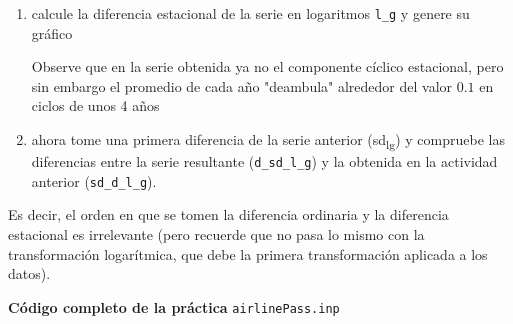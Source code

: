 \documentclass[11pt]{article}
\begin{document}
\begin{enumerate}
\item calcule la diferencia estacional de la serie en logaritmos \texttt{l\_g} y
genere su gráfico

Observe que en la serie obtenida ya no el componente cíclico
estacional, pero sin embargo el promedio de cada año "deambula"
alrededor del valor \(0.1\) en ciclos de unos 4 años

\item ahora tome una primera diferencia de la serie anterior (sd\textsubscript{l}\textsubscript{g}) y
compruebe las diferencias entre la serie resultante (\texttt{d\_sd\_l\_g}) y
la obtenida en la actividad anterior (\texttt{sd\_d\_l\_g}).
\end{enumerate}

Es decir, el orden en que se tomen la diferencia ordinaria y la
diferencia estacional es irrelevante (pero recuerde que no pasa lo
mismo con la transformación logarítmica, que debe la primera
transformación aplicada a los datos).

\vspace{10pt}
\noindent
\textbf{Código completo de la práctica} \texttt{airlinePass.inp}
\vspace{10pt}

\clearpage
\end{document}
